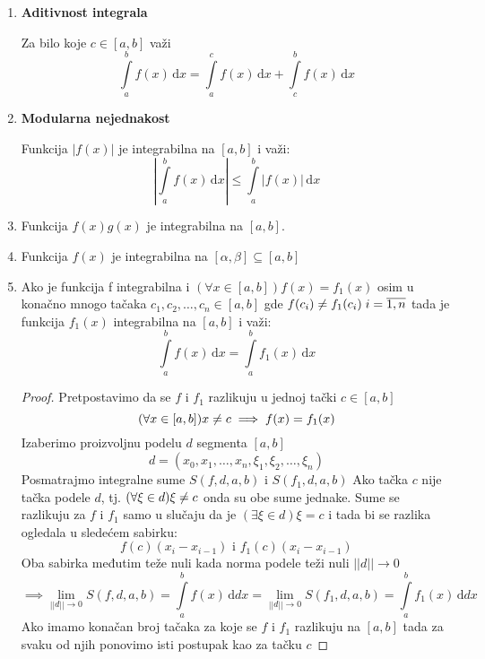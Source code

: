 \begin{enumerate}[label=\textbf{\arabic*.)}]
	\item
		\textbf{Aditivnost integrala}
		\begin{theorem}
			Za bilo koje $c\in [a,b]$ važi $$\int\limits^b_a f(x) \, \mathrm{d} x = \int\limits^c_a f(x) \, \mathrm{d} x + \int\limits^b_c f(x) \, \mathrm{d} x$$
		\end{theorem}
	\item
		\textbf{Modularna nejednakost}
		\begin{theorem}
			Funkcija $|f(x)|$ je integrabilna na $[a,b]$ i važi:
			$$\left| \int \limits^b_a f(x) \, \mathrm{d} x \right| \leq \int \limits^b_a |f(x)| \, \mathrm{d} x$$ 
		\end{theorem}
	\item \begin{theorem}
			Funkcija $f(x)g(x)$ je integrabilna na $[a,b]$.
		\end{theorem}
	\item \begin{theorem}
			Funkcija $f(x)$ je integrabilna na $[\alpha, \beta] \subseteq [a,b]$
		\end{theorem}
	\item
		\begin{theorem}
			Ako je funkcija f integrabilna i $(\forall x \in [a,b]) f(x)=f_1(x)$ osim u konačno mnogo tačaka $c_1, c_2, \ldots, c_n\in[a,b]$ gde $f(c_i) \centernot = f_1(c_i)\; i= \overline{1, n}$ tada je funkcija $f_1(x)$ integrabilna na $[a,b]$ i važi:
			$$\int \limits^b_a f(x) \, \mathrm{d} x = \int \limits^b_a f_1(x) \, \mathrm{d} x$$
		\end{theorem}
		\begin{proof}
			Pretpostavimo da se $f$ i $f_1$ razlikuju u jednoj tački $c \in [a,b]$
			$$(\forall x \in [a,b])x\centernot = c \implies f(x)=f_1(x)$$
			Izaberimo proizvoljnu podelu $d$ segmenta $[a,b]$
			$$d=(x_0, x_1, \ldots,x_n, \xi_1, \xi_2, \ldots, \xi_n)$$
			Posmatrajmo integralne sume $S(f, d, a, b)$ i $S(f_1, d, a, b)$
			Ako tačka $c$ nije tačka podele $d$, tj. $(\forall \xi \in d) \xi\centernot = c$ onda su obe sume jednake. 
			Sume se razlikuju za $f$ i $f_1$ samo u slučaju da je $(\exists \xi \in d) \xi = c$ i tada bi se razlika ogledala u sledećem sabirku:
			$$f(c)(x_i-x_{i-1}) \text{ i } f_1(c)(x_i-x_{i-1})$$
			Oba sabirka međutim teže nuli kada norma podele teži nuli $||d||\to 0$
			$$\implies \lim_{||d||\to 0} S(f, d, a, b) = \int \limits^b_a f(x) \, \mathrm{d}dx = \lim_{||d||\to 0} S(f_1, d, a, b) = \int \limits^b_a f_1(x) \, \mathrm{d}dx  $$
			Ako imamo konačan broj tačaka za koje se $f$ i $f_1$ razlikuju na $[a,b]$ tada za svaku od njih ponovimo isti postupak kao za tačku $c$

\end{proof}
\end{enumerate}
